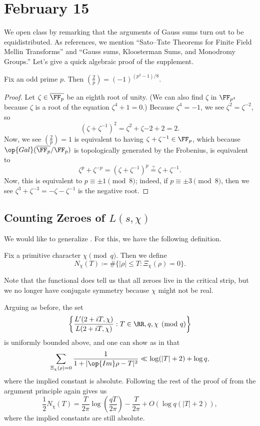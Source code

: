 \documentclass[../notes.tex]{subfiles}
\begin{document}
\section{February 15}

We open class by remarking that the arguments of Gauss sums turn out to be equidistributed. As references, we mention ``Sato--Tate Theorems for Finite Field Mellin Transforms'' and ``Gauss sums, Kloosterman Sums, and Monodromy Groups.'' Let's give a quick algebraic proof of the supplement.
\begin{proposition}
	Fix an odd prime $p$. Then $\left(\frac2p\right)=(-1)^{\left(p^2-1\right)/8}$.
\end{proposition}
\begin{proof}
	Let $\zeta\in\overline{\FF_p}$ be an eighth root of unity. (We can also find $\zeta$ in $\FF_{p^4}$ because $\zeta$ is a root of the equation $\zeta^4+1=0$.) Because $\zeta^4=-1$, we see $\zeta^2=\zeta^{-2}$, so
	\[\left(\zeta+\zeta^{-1}\right)^2=\zeta^2+\zeta{-2}+2=2.\]
	Now, we see $\left(\frac2p\right)=1$ is equivalent to having $\zeta+\zeta^{-1}\in\FF_p$, which because $\op{Gal}(\overline{\FF_p}/\FF_p)$ is topologically generated by the Frobenius, is equivalent to
	\[\zeta^p+\zeta^{-p}=\left(\zeta+\zeta^{-1}\right)^p\stackrel?=\zeta+\zeta^{-1}.\] 
	Now, this is equivalent to $p\equiv\pm1\pmod8$; indeed, if $p\equiv\pm3\pmod8$, then we see $\zeta^3+\zeta^{-3}=-\zeta-\zeta^{-1}$ is the negative root.
\end{proof}

\subsection{Counting Zeroes of \texorpdfstring{$L(s,\chi)$}{ L(s, chi)}}
We would like to generalize . For this, we have the following definition.
\begin{notation}
	Fix a primitive character $\chi\pmod q$. Then we define
	\[N_\chi(T)\coloneqq\#\{|\rho|\le T:\Xi_\chi(\rho)=0\}.\]
\end{notation}
\begin{remark}
	Note that the functional  does tell us that all zeroes live in the critical strip, but we no longer have conjugate symmetry because $\chi$ might not be real.
\end{remark}
Arguing as before, the set
\[\left\{\frac{L'(2+iT,\chi)}{L(2+iT,\chi)}:T\in\RR,q,\chi\pmod q\right\}\]
is uniformly bounded above, and one can show as in  that
\[\sum_{\Xi_\chi(\rho)=0}\frac1{1+|\op{Im}\rho-T|^2}\ll\log(|T|+2)+\log q,\]
where the implied constant is absolute. Following the rest of the proof of  from the argument principle again gives us
\[\frac12N_\chi(T)=\frac T{2\pi}\log\left(\frac{qT}{2\pi}\right)-\frac T{2\pi}+O(\log q(|T|+2)),\]
where the implied constants are still absolute.
\end{document}
